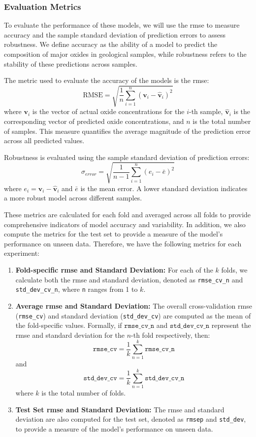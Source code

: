 \subsubsection{Evaluation Metrics}\label{subsec:evaluation_metrics}
To evaluate the performance of these models, we will use the \gls{rmse} to measure accuracy and the sample standard deviation of prediction errors to assess robustness.
We define accuracy as the ability of a model to predict the composition of major oxides in geological samples, while robustness refers to the stability of these predictions across samples.

The metric used to evaluate the accuracy of the models is the \gls{rmse}:
\[
\text{RMSE} = \sqrt{\frac{1}{n} \sum_{i=1}^{n} (\mathbf{v}_i - \hat{\mathbf{v}}_i)^2}
\]
where \( \mathbf{v}_i \) is the vector of actual oxide concentrations for the \( i \)-th sample, \( \hat{\mathbf{v}}_i \) is the corresponding vector of predicted oxide concentrations, and \( n \) is the total number of samples. 
This measure quantifies the average magnitude of the prediction error across all predicted values.

Robustness is evaluated using the sample standard deviation of prediction errors:
\[
\sigma_{error} = \sqrt{\frac{1}{n-1} \sum_{i=1}^{n} (e_i - \bar{e})^2}
\]
where \( e_i = \mathbf{v}_i - \hat{\mathbf{v}}_i \) and \( \bar{e} \) is the mean error.
A lower standard deviation indicates a more robust model across different samples.

These metrics are calculated for each fold and averaged across all folds to provide comprehensive indicators of model accuracy and variability.
In addition, we also compute the metrics for the test set to provide a measure of the model's performance on unseen data.
Therefore, we have the following metrics for each experiment:
\begin{enumerate}
    \item \textbf{Fold-specific \gls{rmse} and Standard Deviation:} For each of the $k$ folds, we calculate both the \gls{rmse} and standard deviation, denoted as \texttt{rmse\_cv\_n} and \texttt{std\_dev\_cv\_n}, where \texttt{n} ranges from 1 to $k$.
    \item \textbf{Average \gls{rmse} and Standard Deviation:} The overall cross-validation \gls{rmse} (\texttt{rmse\_cv}) and standard deviation (\texttt{std\_dev\_cv}) are computed as the mean of the fold-specific values. Formally, if \(\texttt{rmse\_cv\_n}\) and \(\texttt{std\_dev\_cv\_n}\) represent the \gls{rmse} and standard deviation for the \(n\)-th fold respectively, then:
    \[
    \texttt{rmse\_cv} = \frac{1}{k} \sum_{n=1}^{k} \texttt{rmse\_cv\_n}
    \]
    and
    \[
    \texttt{std\_dev\_cv} = \frac{1}{k} \sum_{n=1}^{k} \texttt{std\_dev\_cv\_n}
    \]
    where \(k\) is the total number of folds.
    \item \textbf{Test Set \gls{rmse} and Standard Deviation:} The \gls{rmse} and standard deviation are also computed for the test set, denoted as \texttt{rmsep} and \texttt{std\_dev}, to provide a measure of the model's performance on unseen data.
\end{enumerate}

